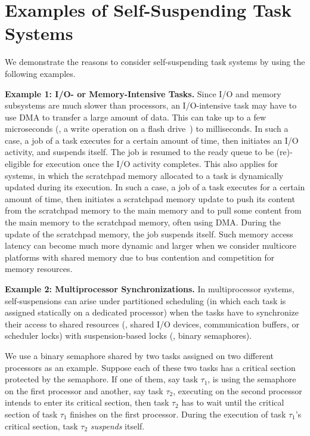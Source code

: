 \section{Examples of Self-Suspending Task Systems}
\label{sec:examples}

We demonstrate the reasons to consider self-suspending task systems by using the following examples.

{\bf Example 1: I/O- or Memory-Intensive Tasks.} Since I/O and memory subsystems are much slower than processors, an I/O-intensive task may have to use DMA to transfer a large amount of data. This can take up to a few microseconds (\eg, a write operation on a flash drive~\cite{Kang:rtss07}) to milliseconds. In such a case, a job of a task executes for a certain amount of time, then initiates an I/O activity, and suspends itself. The job is resumed to the ready queue to be (re)-eligible for execution once the I/O activity completes. This also applies for systems, in which the scratchpad memory allocated to a task is dynamically updated during its execution. In such a case, a job of a task executes for a certain amount of time, then initiates a scratchpad memory update to push its content from the scratchpad memory to the main memory and to pull some content from the main memory to the scratchpad memory, often using DMA. During the update of the scratchpad memory, the job suspends itself. Such memory access latency can become much more dynamic and larger when we consider multicore platforms with shared memory due to bus contention and competition for memory resources.

{\bf Example 2: Multiprocessor Synchronizations.} \hspace{0.1in}
In multiprocessor systems, self-suspensions can arise under partitioned scheduling (in which each task is assigned statically on a dedicated processor) when the tasks have to synchronize their access to shared resources (\eg, shared I/O devices, communication buffers, or scheduler locks) with suspension-based locks (\eg, binary semaphores). 

We use a binary semaphore shared by two tasks assigned on two different processors as an example. Suppose each of these two tasks has a critical section protected by the semaphore. If one of them, say task $\tau_1$, is using the semaphore on the first processor and another, say task $\tau_2$, executing on the second processor intends to enter its critical section, then task $\tau_2$ has to wait until the critical section of task $\tau_1$ finishes on the first processor. During the execution of task $\tau_1$'s critical section, task $\tau_2$ \emph{suspends} itself. 

